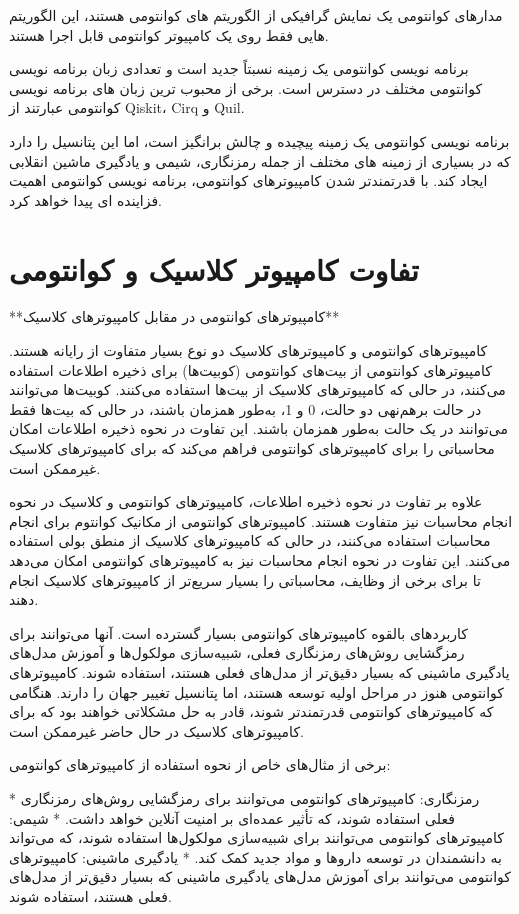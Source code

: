\documentclass{book}
\begin{document}
مدارهای کوانتومی یک نمایش گرافیکی از الگوریتم های کوانتومی هستند، این الگوریتم هایی فقط روی یک کامپیوتر کوانتومی قابل اجرا هستند.

برنامه نویسی کوانتومی یک زمینه نسبتاً جدید است و تعدادی زبان برنامه نویسی کوانتومی مختلف در دسترس است. برخی از محبوب ترین زبان های برنامه نویسی کوانتومی عبارتند از Qiskit، Cirq و Quil.

برنامه نویسی کوانتومی یک زمینه پیچیده و چالش برانگیز است، اما این پتانسیل را دارد که در بسیاری از زمینه های مختلف از جمله رمزنگاری، شیمی و یادگیری ماشین انقلابی ایجاد کند. با قدرتمندتر شدن کامپیوترهای کوانتومی، برنامه نویسی کوانتومی اهمیت فزاینده ای پیدا خواهد کرد.
\section{تفاوت کامپیوتر کلاسیک و کوانتومی}

**کامپیوترهای کوانتومی در مقابل کامپیوترهای کلاسیک**

کامپیوترهای کوانتومی و کامپیوترهای کلاسیک دو نوع بسیار متفاوت از رایانه هستند. کامپیوترهای کوانتومی از بیت‌های کوانتومی (کوبیت‌ها) برای ذخیره اطلاعات استفاده می‌کنند، در حالی که کامپیوترهای کلاسیک از بیت‌ها استفاده می‌کنند. کوبیت‌ها می‌توانند در حالت برهم‌نهی دو حالت، 0 و 1، به‌طور همزمان باشند، در حالی که بیت‌ها فقط می‌توانند در یک حالت به‌طور همزمان باشند. این تفاوت در نحوه ذخیره اطلاعات امکان محاسباتی را برای کامپیوترهای کوانتومی فراهم می‌کند که برای کامپیوترهای کلاسیک غیرممکن است.

علاوه بر تفاوت در نحوه ذخیره اطلاعات، کامپیوترهای کوانتومی و کلاسیک در نحوه انجام محاسبات نیز متفاوت هستند. کامپیوترهای کوانتومی از مکانیک کوانتوم برای انجام محاسبات استفاده می‌کنند، در حالی که کامپیوترهای کلاسیک از منطق بولی استفاده می‌کنند. این تفاوت در نحوه انجام محاسبات نیز به کامپیوترهای کوانتومی امکان می‌دهد تا برای برخی از وظایف، محاسباتی را بسیار سریع‌تر از کامپیوترهای کلاسیک انجام دهند.

کاربردهای بالقوه کامپیوترهای کوانتومی بسیار گسترده است. آنها می‌توانند برای رمزگشایی روش‌های رمزنگاری فعلی، شبیه‌سازی مولکول‌ها و آموزش مدل‌های یادگیری ماشینی که بسیار دقیق‌تر از مدل‌های فعلی هستند، استفاده شوند. کامپیوترهای کوانتومی هنوز در مراحل اولیه توسعه هستند، اما پتانسیل تغییر جهان را دارند. هنگامی که کامپیوترهای کوانتومی قدرتمندتر شوند، قادر به حل مشکلاتی خواهند بود که برای کامپیوترهای کلاسیک در حال حاضر غیرممکن است.

 برخی از مثال‌های خاص از نحوه استفاده از کامپیوترهای کوانتومی:

* رمزنگاری: کامپیوترهای کوانتومی می‌توانند برای رمزگشایی روش‌های رمزنگاری فعلی استفاده شوند، که تأثیر عمده‌ای بر امنیت آنلاین خواهد داشت.
* شیمی: کامپیوترهای کوانتومی می‌توانند برای شبیه‌سازی مولکول‌ها استفاده شوند، که می‌تواند به دانشمندان در توسعه داروها و مواد جدید کمک کند.
* یادگیری ماشینی: کامپیوترهای کوانتومی می‌توانند برای آموزش مدل‌های یادگیری ماشینی که بسیار دقیق‌تر از مدل‌های فعلی هستند، استفاده شوند.
\end{document}
